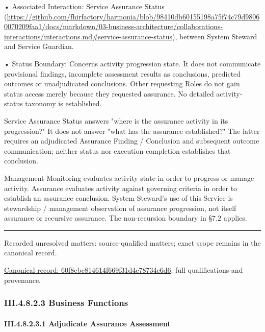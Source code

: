 •
Associated Interaction: Service Assurance Status (\url{https://github.com/fhirfactory/harmonia/blob/98410db60155198a75f74c79d98060070209faa1/docs/markdown/03-business-architecture/collaborations-interactions/interactions.md#service-assurance-status}), between System Steward and Service Guardian.



•
Status Boundary: Concerns activity progression state. It does not communicate provisional findings, incomplete assessment results as conclusions, predicted outcomes or unadjudicated conclusions. Other requesting Roles do not gain status access merely because they requested assurance. No detailed activity-status taxonomy is established.



Service Assurance Status answers "where is the assurance activity in its progression?" It does not answer "what has the assurance established?" The latter requires an adjudicated Assurance Finding / Conclusion and subsequent outcome communication; neither status nor execution completion establishes that conclusion.



Management Monitoring evaluates activity state in order to progress or manage activity. Assurance evaluates activity against governing criteria in order to establish an assurance conclusion. System Steward's use of this Service is stewardship / management observation of assurance progression, not itself assurance or recursive assurance. The non-recursion boundary in §7.2 applies.



\medskip\hrule\medskip

{\small Recorded unresolved matters: source-qualified matters; exact scope remains in the canonical record.}\par
{\footnotesize \href{../../../../../../../../continuum/business/business-service/60f8cbc814614f669f31d4e78734c6d6.md}{Canonical record: 60f8cbc814614f669f31d4e78734c6d6}; full qualifications and provenance.}\par
\subsubsection*{III.4.8.2.3 Business Functions}
\label{navigation:III.4.8.2.3}

\paragraph*{III.4.8.2.3.1 Adjudicate Assurance Assessment}
\label{navigation:III.4.8.2.3.1}

